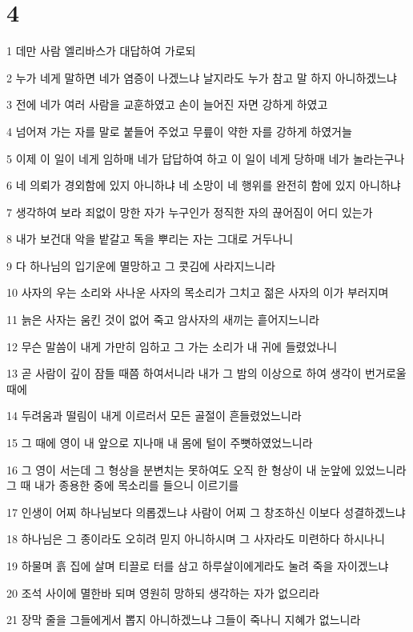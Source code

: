\chapter{4}

\par 1 데만 사람 엘리바스가 대답하여 가로되
\par 2 누가 네게 말하면 네가 염증이 나겠느냐 날지라도 누가 참고 말 하지 아니하겠느냐
\par 3 전에 네가 여러 사람을 교훈하였고 손이 늘어진 자면 강하게 하였고
\par 4 넘어져 가는 자를 말로 붙들어 주었고 무릎이 약한 자를 강하게 하였거늘
\par 5 이제 이 일이 네게 임하매 네가 답답하여 하고 이 일이 네게 당하매 네가 놀라는구나
\par 6 네 의뢰가 경외함에 있지 아니하냐 네 소망이 네 행위를 완전히 함에 있지 아니하냐
\par 7 생각하여 보라 죄없이 망한 자가 누구인가 정직한 자의 끊어짐이 어디 있는가
\par 8 내가 보건대 악을 밭갈고 독을 뿌리는 자는 그대로 거두나니
\par 9 다 하나님의 입기운에 멸망하고 그 콧김에 사라지느니라
\par 10 사자의 우는 소리와 사나운 사자의 목소리가 그치고 젊은 사자의 이가 부러지며
\par 11 늙은 사자는 움킨 것이 없어 죽고 암사자의 새끼는 흩어지느니라
\par 12 무슨 말씀이 내게 가만히 임하고 그 가는 소리가 내 귀에 들렸었나니
\par 13 곧 사람이 깊이 잠들 때쯤 하여서니라 내가 그 밤의 이상으로 하여 생각이 번거로울 때에
\par 14 두려움과 떨림이 내게 이르러서 모든 골절이 흔들렸었느니라
\par 15 그 때에 영이 내 앞으로 지나매 내 몸에 털이 주뼛하였었느니라
\par 16 그 영이 서는데 그 형상을 분변치는 못하여도 오직 한 형상이 내 눈앞에 있었느니라 그 때 내가 종용한 중에 목소리를 들으니 이르기를
\par 17 인생이 어찌 하나님보다 의롭겠느냐 사람이 어찌 그 창조하신 이보다 성결하겠느냐
\par 18 하나님은 그 종이라도 오히려 믿지 아니하시며 그 사자라도 미련하다 하시나니
\par 19 하물며 흙 집에 살며 티끌로 터를 삼고 하루살이에게라도 눌려 죽을 자이겠느냐
\par 20 조석 사이에 멸한바 되며 영원히 망하되 생각하는 자가 없으리라
\par 21 장막 줄을 그들에게서 뽑지 아니하겠느냐 그들이 죽나니 지혜가 없느니라

